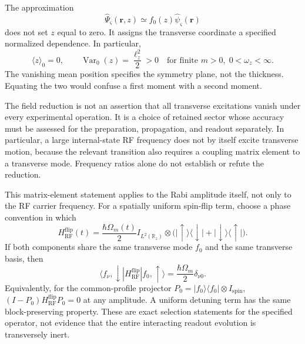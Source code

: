 \documentclass[11pt,a4paper]{article}
\theoremstyle{definition}
\theoremstyle{remark}
\newcommand{\Var}{\operatorname{Var}}
\newcommand{\R}{\mathbb{R}}
\newcommand{\lop}{\ell_z}
\begin{document}
The approximation
\begin{equation}
 \widehat\Psi_{\varsigma}(\boldsymbol r,z)
 \simeq f_0(z)\widehat\psi_{\varsigma}(\boldsymbol r)
 \label{eq:factorization}
\end{equation}
does not set $z$ equal to zero. It assigns the transverse coordinate a specified normalized dependence. In particular,
\begin{equation}
 \langle z\rangle_0=0,\qquad
 \Var_0(z)=\frac{\lop^2}{2}>0
 \quad\text{for finite }m>0,\;0<\omega_z<\infty.
 \label{eq:width}
\end{equation}
The vanishing mean position specifies the symmetry plane, not the thickness. Equating the two would confuse a first moment with a second moment.

The field reduction is not an assertion that all transverse excitations vanish under every experimental operation. It is a choice of retained sector whose accuracy must be assessed for the preparation, propagation, and readout separately. In particular, a large internal-state RF frequency does not by itself excite transverse motion, because the relevant transition also requires a coupling matrix element to a transverse mode. Frequency ratios alone do not establish or refute the reduction.\cite{zhang2026,precursor}

This matrix-element statement applies to the Rabi amplitude itself, not only to the RF carrier frequency. For a spatially uniform spin-flip term, choose a phase convention in which
\[
 H_{\mathrm{RF}}^{\mathrm{flip}}(t)
 =\frac{\hbar\Omega_m(t)}{2}I_{L^2(\R_z)}\otimes
 \bigl(\lvert\uparrow\rangle\langle\downarrow\rvert
       +\lvert\downarrow\rangle\langle\uparrow\rvert\bigr).
\]
If both components share the same transverse mode $f_0$ and the same transverse basis, then
\[
 \langle f_\nu,\downarrow|H_{\mathrm{RF}}^{\mathrm{flip}}
          |f_0,\uparrow\rangle
 =\frac{\hbar\Omega_m}{2}\delta_{\nu0}.
\]
Equivalently, for the common-profile projector
$P_0=|f_0\rangle\langle f_0|\otimes I_{\mathrm{spin}}$,
$(I-P_0)H_{\mathrm{RF}}^{\mathrm{flip}}P_0=0$ at any amplitude. A uniform detuning term has the same block-preserving property. These are exact selection statements for the specified operator, not evidence that the entire interacting readout evolution is transversely inert.\cite{zhang2026,precursor}
\end{document}
